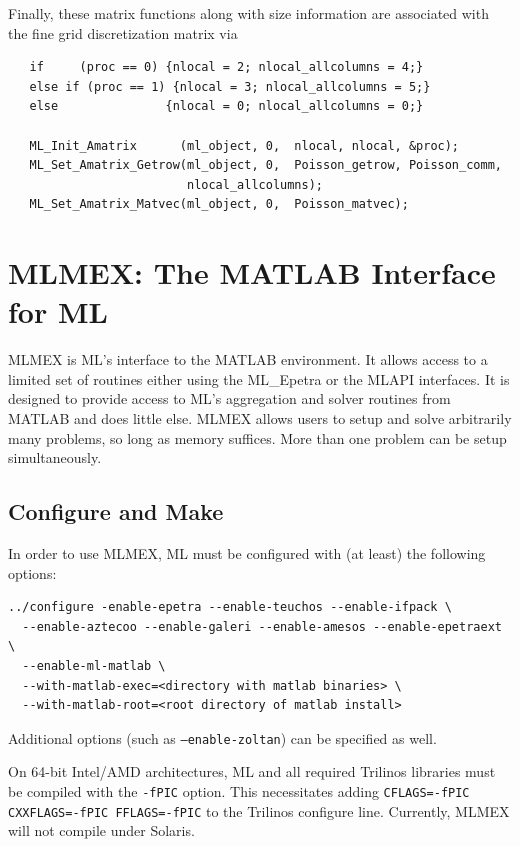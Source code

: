 \documentclass{article}[11pt]
\begin{document}
\noindent
Finally, these matrix functions along with size information are associated with the
fine grid discretization matrix via
\begin{verbatim}
   if     (proc == 0) {nlocal = 2; nlocal_allcolumns = 4;}
   else if (proc == 1) {nlocal = 3; nlocal_allcolumns = 5;}
   else               {nlocal = 0; nlocal_allcolumns = 0;}

   ML_Init_Amatrix      (ml_object, 0,  nlocal, nlocal, &proc);
   ML_Set_Amatrix_Getrow(ml_object, 0,  Poisson_getrow, Poisson_comm, 
                         nlocal_allcolumns);
   ML_Set_Amatrix_Matvec(ml_object, 0,  Poisson_matvec);
\end{verbatim}



\section{MLMEX: The MATLAB Interface for ML} \label{sec:mlmex}
MLMEX is ML's interface to the MATLAB environment.  It allows access
to a limited set of routines either using the ML\_Epetra or the MLAPI
interfaces.  It is designed to provide access to ML's aggregation and
solver routines from MATLAB and does little else.  MLMEX allows users
to setup and solve arbitrarily many problems, so long as memory
suffices.  More than one problem can be setup simultaneously. 

\subsection{Configure and Make}\label{sec:mlmex:conf_make}
In order to use MLMEX, ML must be configured with (at least) the following options:
\begin{verbatim}
../configure -enable-epetra --enable-teuchos --enable-ifpack \
  --enable-aztecoo --enable-galeri --enable-amesos --enable-epetraext \
  --enable-ml-matlab \
  --with-matlab-exec=<directory with matlab binaries> \
  --with-matlab-root=<root directory of matlab install>
\end{verbatim}
Additional options (such as \texttt{--enable-zoltan}) can be specified
as well.

On 64-bit Intel/AMD architectures, ML and all required Trilinos
libraries must be compiled with the \texttt{-fPIC} option.  This
necessitates adding \verb!CFLAGS=-fPIC CXXFLAGS=-fPIC FFLAGS=-fPIC! to
the Trilinos configure line.  Currently, MLMEX will not compile under
Solaris. 
\end{document}
